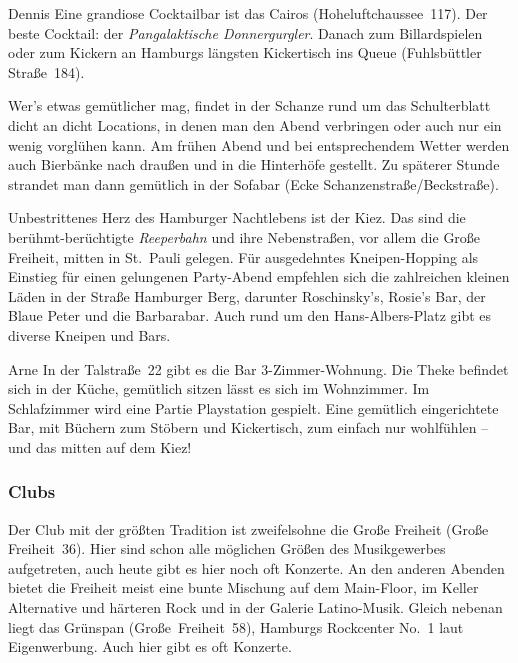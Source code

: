 \begin{advice}{Dennis}
Eine grandiose Cocktailbar ist das Cairos (Hoheluftchaussee~117). Der beste
Cocktail: der \emph{Pangalaktische Donnergurgler}. Danach zum Billardspielen
oder zum Kickern an Hamburgs längsten Kickertisch ins Queue (Fuhlsbüttler
Straße~184).
\end{advice}

Wer's etwas gemütlicher mag, findet in der Schanze rund um das Schulterblatt
dicht an dicht Locations, in denen man den Abend verbringen oder auch nur ein
wenig vorglühen kann. Am frühen Abend und bei entsprechendem Wetter werden auch
Bierbänke nach draußen und in die Hinterhöfe gestellt. Zu späterer Stunde
strandet man dann gemütlich in der Sofabar (Ecke Schanzenstraße/Beckstraße).

Unbestrittenes Herz des Hamburger Nachtlebens ist der Kiez. Das sind die
berühmt-berüchtigte \emph{Reeperbahn} und ihre Nebenstraßen, vor allem die
Große Freiheit, mitten in St.~Pauli gelegen. Für ausgedehntes Kneipen-Hopping
als Einstieg für einen gelungenen Party-Abend empfehlen sich die zahlreichen
kleinen Läden in der Straße Hamburger Berg, darunter Roschinsky's, Rosie's Bar,
der Blaue Peter und die Barbarabar. Auch rund um den Hans-Albers-Platz gibt es
diverse Kneipen und Bars.

\begin{advice}{Arne}
In der Talstraße~22 gibt es die Bar 3-Zimmer-Wohnung. Die Theke befindet sich
in der Küche, gemütlich sitzen lässt es sich im Wohnzimmer. Im Schlafzimmer
wird eine Partie Playstation gespielt. Eine gemütlich eingerichtete Bar, mit
Büchern zum Stöbern und Kickertisch, zum einfach nur wohlfühlen -- und das
mitten auf dem Kiez!
\end{advice}

\subsubsection{Clubs}

Der Club mit der größten Tradition ist zweifelsohne die Große Freiheit (Große
Freiheit~36). Hier sind schon alle möglichen Größen des Musikgewerbes
aufgetreten, auch heute gibt es hier noch oft Konzerte. An den anderen Abenden
bietet die Freiheit meist eine bunte Mischung auf dem Main-Floor, im Keller
Alternative und härteren Rock und in der Galerie Latino-Musik. Gleich nebenan
liegt das Grünspan (Große~Freiheit~58), \glqq Hamburgs Rockcenter No.~1\grqq
laut Eigenwerbung. Auch hier gibt es oft Konzerte.

